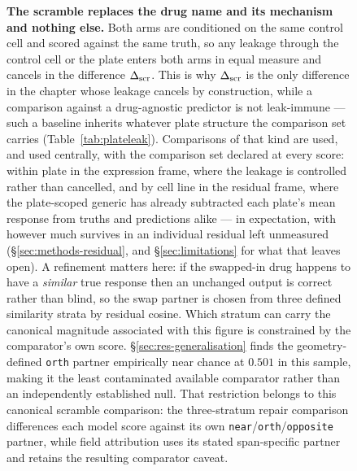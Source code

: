 \begin{figure}[htbp]
\caption[The scramble ablation]{\textbf{The scramble replaces the drug name and its mechanism and
nothing else.} Both arms are conditioned on the same control cell and scored against the same truth,
so any leakage through the control cell or the plate enters both arms in equal measure and cancels in
the difference $\Delta_{\textrm{scr}}$. This is why $\Delta_{\textrm{scr}}$ is the only difference in the chapter whose leakage cancels
by construction, while a comparison against a drug-agnostic predictor is not leak-immune --- such a
baseline inherits whatever plate structure the comparison set carries
(Table~\ref{tab:plateleak}). Comparisons of that kind are used, and used centrally, with the
comparison set declared at every score: within plate in the expression frame, where the leakage is
controlled rather than cancelled, and by cell line in the residual frame, where the plate-scoped
generic has already subtracted each plate's mean response from truths and predictions alike --- in
expectation, with however much survives in an individual residual left unmeasured
(\S\ref{sec:methods-residual}, and \S\ref{sec:limitations} for what that leaves open).
A refinement matters here: if the swapped-in drug happens to have a
\emph{similar} true response then an unchanged output is correct rather than blind, so the swap
partner is chosen from three defined similarity strata by residual cosine. Which stratum can carry
the canonical magnitude associated with this figure is constrained by the comparator's own score.
\S\ref{sec:res-generalisation} finds the geometry-defined \texttt{orth} partner empirically near
chance at $0.501$ in this sample, making it the least contaminated available comparator rather than
an independently established null. That restriction belongs to this canonical scramble comparison:
the three-stratum repair comparison differences each model score against its own
\texttt{near}/\texttt{orth}/\texttt{opposite} partner, while field attribution uses its stated
span-specific partner and retains the resulting comparator caveat.}
\label{fig:scramble}
\end{figure}

